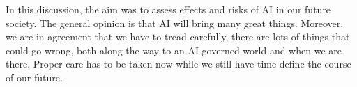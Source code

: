 \documentclass{article}
\begin{document}
In this discussion, the aim was to assess effects and risks of AI in our future society. The general opinion is that AI will bring many great things. Moreover, we are in agreement that we have to tread carefully, there are lots of things that could go wrong, both along the way to an AI governed world and when we are there. Proper care has to be taken now while we still have time define the course of our future.
\end{document}
